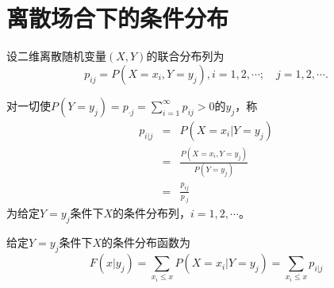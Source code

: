 \section{离散场合下的条件分布}
设二维离散随机变量$(X,Y)$的联合分布列为$$p_{i j}=P\left(X=x_{i}, Y=y_{j}\right), i=1,2, \cdots;\quad j=1,2, \cdots.$$
\begin{definition}
对一切使$P\left(Y=y_{j}\right)=p_{\cdot j}=\sum_{i=1}^{\infty} p_{i j}>0$的$y_{j}$，称
\begin{eqnarray*}
p_{i  |  j} &=&P\left(X=x_{i}  |  Y=y_{j}\right) \\
&=&\frac{P\left(X=x_{i}, Y=y_{j}\right)}{P\left(Y=y_{j}\right)} \\
&=&\frac{p_{i j}}{p_{\cdot j}  }
\end{eqnarray*}
为给定$Y=y_{j}$条件下$X$的条件分布列，$i=1,2,\cdots$。
\end{definition}
\begin{definition}
给定$Y=y_{j}$条件下$X$的条件分布函数为
$$F\left(x  |  y_{j}\right)=\sum_{x_{i} \leq x} P\left(X=x_{i}  |  Y=y_{j}\right)=\sum_{x_{i} \leq x} p_{i  |  j}$$
\end{definition}

